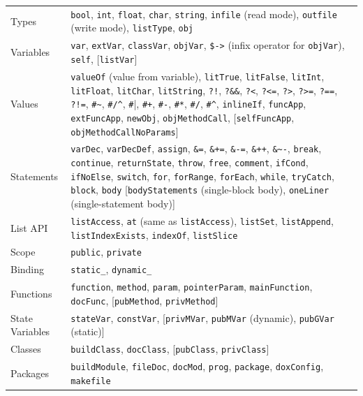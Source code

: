 \documentclass{beamer}
\begin{document}
\begin{frame}[fragile]
\tiny
\begin{tabular}{p{1.5cm}| p{7cm}}
  Types & \verb|bool|, \verb|int|, \verb|float|, \verb|char|, 
  \verb|string|, 
  \verb|infile| (read mode), \verb|outfile| (write mode), 
  \verb|listType|, 
  \verb|obj| \\
  Variables & \verb|var|, \verb|extVar|, \verb|classVar|, \verb|objVar|, 
  \verb|$->| (infix operator for \verb|objVar|), \verb|self|,
  [\verb|listVar|] \\
  Values & \verb|valueOf| (value from variable), \verb|litTrue|, 
  \verb|litFalse|, \verb|litInt|, 
  \verb|litFloat|, \verb|litChar|, \verb|litString|, \verb|?!|, 
  \verb|?&&|, 
  \verb|?<|, \verb|?<=|, \verb|?>|, \verb|?>=|, \verb|?==|, \verb|?!=|, 
  \verb|#~|, \verb|#/^|, \verb|#||, \verb|#+|, \verb|#-|, \verb|#*|, 
  \verb|#/|, \verb|#^|, \verb|inlineIf|, \verb|funcApp|, 
  \verb|extFuncApp|, 
  \verb|newObj|, \verb|objMethodCall|, [\verb|selfFuncApp|, 
  \verb|objMethodCallNoParams|] \\
  Statements & \verb|varDec|, \verb|varDecDef|, \verb|assign|, \verb|&=|, 
  \verb|&+=|, \verb|&-=|, \verb|&++|, \verb|&~-|, \verb|break|, 
  \verb|continue|, \verb|returnState|, \verb|throw|, \verb|free|, 
  \verb|comment|, \verb|ifCond|, \verb|ifNoElse|, \verb|switch|, 
  \verb|for|, 
  \verb|forRange|, \verb|forEach|, \verb|while|, \verb|tryCatch|, 
  \verb|block|, \verb|body| [\verb|bodyStatements| (single-block body), 
  \verb|oneLiner| (single-statement body)] \\
  List API & \verb|listAccess|, \verb|at| (same as \verb|listAccess|), 
  \verb|listSet|, \verb|listAppend|, \verb|listIndexExists|, 
  \verb|indexOf|, \verb|listSlice| \\
  Scope & \verb|public|, \verb|private| \\
  Binding & \verb|static_|, \verb|dynamic_| \\
  Functions & \verb|function|, \verb|method|, \verb|param|, 
  \verb|pointerParam|, \verb|mainFunction|, \verb|docFunc|, 
  [\verb|pubMethod|, \verb|privMethod|] \\
  State Variables & \verb|stateVar|, \verb|constVar|, [\verb|privMVar|, 
  \verb|pubMVar| (dynamic), \verb|pubGVar| (static)]\\
  Classes & \verb|buildClass|, \verb|docClass|, [\verb|pubClass|, 
  \verb|privClass|]\\
  Packages & \verb|buildModule|, \verb|fileDoc|, \verb|docMod|, 
  \verb|prog|, 
  \verb|package|, \verb|doxConfig|, \verb|makefile|
\end{tabular}

\end{frame}
\end{document}
